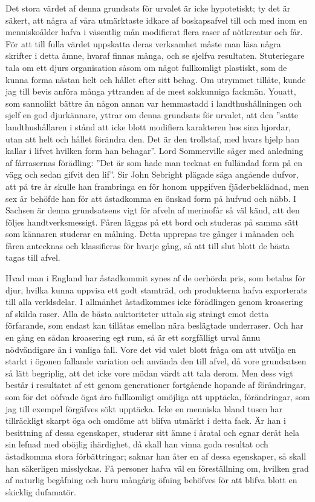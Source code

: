 Det stora värdet af denna grundsats för urvalet är icke hypotetiskt; ty det är säkert, att några af våra utmärktaste idkare af boskapsafvel till och med inom en menniskoålder hafva i väsentlig mån modifierat flera raser af nötkreatur och får. För att till fulla värdet uppskatta deras verksamhet måste man läsa några skrifter i detta ämne, hvaraf finnas många, och se sjelfva resultaten. Stuteriegare tala om ett djurs organisation såsom om något fullkomligt plastiskt, som de kunna forma nästan helt och hållet efter sitt behag. Om utrymmet tilläte, kunde jag till bevis anföra många yttranden af de mest sakkunniga fackmän. Youatt, som sannolikt bättre än någon annan var hemmastadd i landthushållningen och sjelf en god djurkännare, yttrar om denna grundsats för urvalet, att den ”satte landthushållaren i stånd att icke blott modifiera karakteren hos sina hjordar, utan att helt och hållet förändra den. Det är den trollstaf, med hvars hjelp han kallar i lifvet hvilken form han behagar”. Lord Sommerville säger med anledning af fårrasernas förädling: ”Det är som hade man tecknat en fulländad form på en vägg och sedan gifvit den lif”. Sir John Sebright plägade säga angående dufvor, att på tre år skulle han frambringa en för honom uppgifven fjäderbeklädnad, men sex år behöfde han för att åstadkomma en önskad form på hufvud och näbb. I Sachsen är denna grundsatsens vigt för afveln af merinofår så väl känd, att den följes handtverksmessigt. Fåren läggas på ett bord och studeras på samma sätt som kännaren studerar en målning. Detta upprepas tre gånger i månaden och fåren antecknas och klassifieras för hvarje gång, så att till slut blott de bästa tagas till afvel.

Hvad man i England har åstadkommit synes af de oerhörda pris, som betalas för djur, hvilka kunna uppvisa ett godt stamträd, och produkterna hafva exporterats till alla verldsdelar. I allmänhet åstadkommes icke förädlingen genom kroasering af skilda raser. Alla de bästa auktoriteter uttala sig strängt emot detta förfarande, som endast kan tillåtas emellan nära beslägtade underraser. Och har en gång en sådan kroasering egt rum, så är ett sorgfälligt urval ännu nödvändigare än i vanliga fall. Vore det vid valet blott fråga om att utvälja en starkt i ögonen fallande variation och använda den till afvel, då vore grundsatsen så lätt begriplig, att det icke vore mödan värdt att tala derom. Men dess vigt består i resultatet af ett genom generationer fortgående hopande af förändringar, som för det oöfvade ögat äro fullkomligt omöjliga att upptäcka, förändringar, som jag till exempel förgäfves sökt upptäcka. Icke en menniska bland tusen har tillräckligt skarpt öga och omdöme att blifva utmärkt i detta fack. Är han i besittning af dessa egenskaper, studerar sitt ämne i åratal och egnar deråt hela sin lefnad med oböjlig ihärdighet, då skall han vinna goda resultat och åstadkomma stora förbättringar; saknar han åter en af dessa egenskaper, så skall han säkerligen misslyckas. Få personer hafva väl en föreställning om, hvilken grad af naturlig begåfning och huru mångårig öfning behöfves för att blifva blott en skicklig dufamatör.

